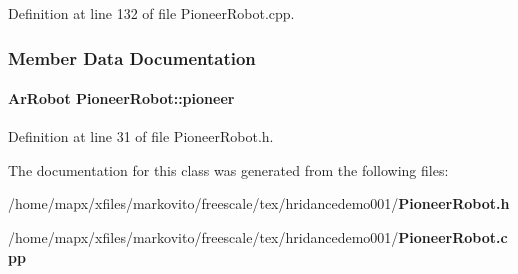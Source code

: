 \-Definition at line 132 of file \-Pioneer\-Robot.\-cpp.



\subsubsection{\-Member \-Data \-Documentation}
\paragraph[{pioneer}]{\setlength{\rightskip}{0pt plus 5cm}\-Ar\-Robot {\bf \-Pioneer\-Robot\-::pioneer}}\label{class_pioneer_robot_a05e2fbb4d51eef3358e122508cdbfbfb}


\-Definition at line 31 of file \-Pioneer\-Robot.\-h.



\-The documentation for this class was generated from the following files\-:\begin{DoxyCompactItemize}
\item 
/home/mapx/xfiles/markovito/freescale/tex/hridancedemo001/{\bf \-Pioneer\-Robot.\-h}\item 
/home/mapx/xfiles/markovito/freescale/tex/hridancedemo001/{\bf \-Pioneer\-Robot.\-cpp}\end{DoxyCompactItemize}

